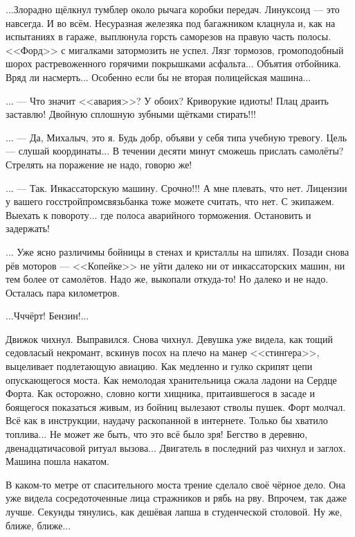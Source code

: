 \emptypar

...Злорадно щёлкнул тумблер около рычага коробки передач. Линуксоид --- это навсегда. И во всём.
Несуразная железяка под багажником клацнула и, как на испытаниях в гараже, выплюнула горсть саморезов на правую часть полосы.
<<Форд>> с мигалками затормозить не успел. Лязг тормозов, громоподобный шорох растревоженного горячими покрышками асфальта...
Объятия отбойника. Вряд ли насмерть... Особенно если бы не вторая полицейская машина...

\emptypar

... --- Что значит <<авария>>? У обоих? Криворукие идиоты! Плац драить заставлю! Двойную сплошную зубными щётками стирать!!!

... --- Да, Михалыч, это я. Будь добр, объяви у себя типа учебную тревогу. Цель --- слушай координаты...
В течении десяти минут сможешь прислать самолёты? Стрелять на поражение не надо, говорю же!

... --- Так. Инкассаторскую машину. Срочно!!! А мне плевать, что нет.
Лицензии у вашего госстройпромсвязьбанка тоже можете считать, что нет.
С экипажем. Выехать к повороту... где полоса аварийного торможения. Остановить и задержать!

\emptypar

... Уже ясно различимы бойницы в стенах и кристаллы на шпилях.
Позади снова рёв моторов --- <<Копейке>> не уйти далеко ни от инкассаторских машин, ни тем более от самолётов.
Надо же, выкопали откуда-то! Но далеко и не надо. Осталась пара километров.

\emptypar

...Чччёрт! Бензин!...

\emptypar

Движок чихнул. Выправился. Снова чихнул. Девушка уже видела, как тощий седовласый некромант,
вскинув посох на плечо на манер <<стингера>>, выцеливает подлетающую авиацию.
Как медленно и гулко скрипят цепи опускающегося моста. Как немолодая хранительница сжала ладони на Сердце Форта.
Как осторожно, словно когти хищника, притаившегося в засаде и боящегося показаться живым, из бойниц вылезают стволы пушек.
Форт молчал. Всё как в инструкции, наудачу раскопанной в интернете. Только бы хватило топлива...
Не может же быть, что это всё было зря! Бегство в деревню, двенадцатичасовой ритуал вызова...
Двигатель в последний раз чихнул и заглох. Машина пошла накатом.

\emptypar

В каком-то метре от спасительного моста трение сделало своё чёрное дело.
Она уже видела сосредоточенные лица стражников и рябь на рву.
Впрочем, так даже лучше. Секунды тянулись, как дешёвая лапша в студенческой столовой. Ну же, ближе, ближе...


